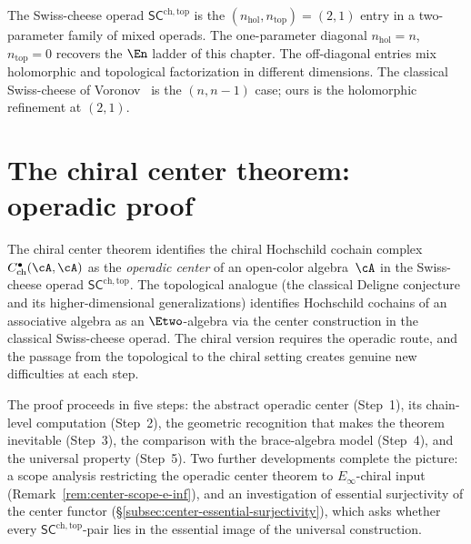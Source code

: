\begin{remark}
\label{rem:sc-dimensional-ladder}
The Swiss-cheese operad $\mathsf{SC}^{\mathrm{ch,top}}$ is the
$(n_{\mathrm{hol}}, n_{\mathrm{top}}) = (2, 1)$ entry in a
two-parameter family of mixed operads. The one-parameter diagonal
$n_{\mathrm{hol}} = n$, $n_{\mathrm{top}} = 0$ recovers the $\En$
ladder of this chapter. The off-diagonal entries mix holomorphic
and topological factorization in different dimensions. The
classical Swiss-cheese of Voronov~\cite{Voronov99} is the
$(n, n-1)$ case; ours is the holomorphic refinement at $(2, 1)$.
\end{remark}



\section{The chiral center theorem: operadic proof}
\label{sec:operadic-center-theorem}

The chiral center theorem identifies the chiral Hochschild cochain
complex $C^{\bullet}_{\mathrm{ch}}(\cA, \cA)$ as the \emph{operadic
center} of an open-color algebra~$\cA$ in the Swiss-cheese operad
$\mathsf{SC}^{\mathrm{ch,top}}$. The topological analogue (the
classical Deligne conjecture and its higher-dimensional
generalizations) identifies Hochschild cochains of an associative
algebra as an $\Etwo$-algebra via the center construction in the
classical Swiss-cheese operad. The chiral version requires the
operadic route, and the passage from the topological to the chiral
setting creates genuine new difficulties at each step.

The proof proceeds in five steps: the abstract operadic center
(Step~1), its chain-level computation (Step~2), the geometric
recognition that makes the theorem inevitable (Step~3), the
comparison with the brace-algebra model (Step~4), and the universal
property (Step~5). Two further developments complete the picture:
a scope analysis restricting the operadic center theorem to
$E_\infty$-chiral input
(Remark~\ref{rem:center-scope-e-inf}), and an investigation of
essential surjectivity of the center functor
(\S\ref{subsec:center-essential-surjectivity}), which asks whether
every $\mathsf{SC}^{\mathrm{ch,top}}$-pair lies in the essential
image of the universal construction.

